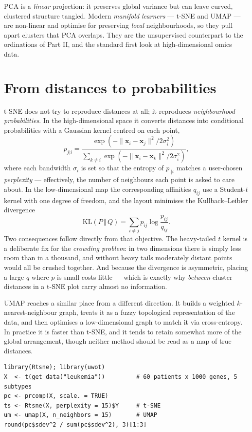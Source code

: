 \documentclass[11pt,oneside]{book}
\begin{document}
PCA is a \emph{linear} projection: it preserves global variance but can leave curved,
clustered structure tangled. Modern \emph{manifold learners} — t-SNE and UMAP — are
non-linear and optimise for preserving \emph{local} neighbourhoods, so they pull apart
clusters that PCA overlaps. They are the unsupervised counterpart to the ordinations of
Part II, and the standard first look at high-dimensional omics data.

\section{From distances to probabilities}
t-SNE \cite{vanderMaaten_2008} does not try to reproduce distances at all; it reproduces
\emph{neighbourhood probabilities}. In the high-dimensional space it converts distances
into conditional probabilities with a Gaussian kernel centred on each point,
\[
  p_{j|i}=\frac{\exp\!\left(-\lVert \mathbf{x}_i-\mathbf{x}_j\rVert^{2}/2\sigma_i^{2}\right)}
               {\sum_{k\neq i}\exp\!\left(-\lVert \mathbf{x}_i-\mathbf{x}_k\rVert^{2}/2\sigma_i^{2}\right)},
\]
where each bandwidth $\sigma_i$ is set so that the entropy of $p_{\cdot|i}$ matches a
user-chosen \emph{perplexity} — effectively, the number of neighbours each point is asked
to care about. In the low-dimensional map the corresponding affinities $q_{ij}$ use a
Student-$t$ kernel with one degree of freedom, and the layout minimises the
Kullback--Leibler divergence
\[
  \mathrm{KL}(P\,\Vert\,Q)=\sum_{i\neq j}p_{ij}\log\frac{p_{ij}}{q_{ij}} .
\]
Two consequences follow directly from that objective. The heavy-tailed $t$ kernel is a
deliberate fix for the \emph{crowding problem}: in two dimensions there is simply less room
than in a thousand, and without heavy tails moderately distant points would all be crushed
together. And because the divergence is asymmetric, placing a large $q$ where $p$ is small
costs little — which is exactly why \emph{between}-cluster distances in a t-SNE plot carry
almost no information.

UMAP \cite{McInnes_2018} reaches a similar place from a different direction. It builds a
weighted $k$-nearest-neighbour graph, treats it as a fuzzy topological representation of
the data, and then optimises a low-dimensional graph to match it via cross-entropy. In
practice it is faster than t-SNE, and it tends to retain somewhat more of the global
arrangement, though neither method should be read as a map of true distances.

\begin{lstlisting}
library(Rtsne); library(uwot)
X  <- t(get_data("leukemia"))         # 60 patients x 1000 genes, 5 subtypes
pc <- prcomp(X, scale. = TRUE)
ts <- Rtsne(X, perplexity = 15)$Y     # t-SNE
um <- umap(X, n_neighbors = 15)       # UMAP
round(pc$sdev^2 / sum(pc$sdev^2), 3)[1:3]
\end{lstlisting}
\end{document}
